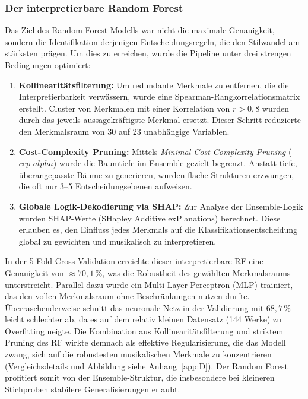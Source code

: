 \documentclass[10pt,a4paper]{article}
\theoremstyle{definition}
\begin{document}
\subsubsection{Der interpretierbare Random Forest}
Das Ziel des Random-Forest-Modells war nicht die maximale Genauigkeit, sondern die Identifikation derjenigen Entscheidungsregeln, die den Stilwandel am stärksten prägen. Um dies zu erreichen, wurde die Pipeline unter drei strengen Bedingungen optimiert:

\begin{enumerate}
    \item \textbf{Kollinearitätsfilterung:} Um redundante Merkmale zu entfernen, die die Interpretierbarkeit verwässern, wurde eine Spearman-Rangkorrelationsmatrix erstellt. Cluster von Merkmalen mit einer Korrelation von $r > 0{,}8$ wurden durch das jeweils aussagekräftigste Merkmal ersetzt. Dieser Schritt reduzierte den Merkmalsraum von 30 auf 23 unabhängige Variablen.
    
    \item \textbf{Cost-Complexity Pruning:} Mittels \textit{Minimal Cost-Complexity Pruning} ($ccp\_alpha$) wurde die Baumtiefe im Ensemble gezielt begrenzt. Anstatt tiefe, überangepasste Bäume zu generieren, wurden flache Strukturen erzwungen, die oft nur 3--5 Entscheidungsebenen aufweisen.
    
    \item \textbf{Globale Logik-Dekodierung via SHAP:} Zur Analyse der Ensemble-Logik wurden SHAP-Werte (SHapley Additive exPlanations) berechnet. Diese erlauben es, den Einfluss jedes Merkmals auf die Klassifikationsentscheidung global zu gewichten und musikalisch zu interpretieren.
\end{enumerate}

\noindent In der 5-Fold Cross-Validation erreichte dieser interpretierbare RF eine Genauigkeit von $\approx 70{,}1\,\%$, was die Robustheit des gewählten Merkmalsraums unterstreicht. Parallel dazu wurde ein Multi-Layer Perceptron (MLP) trainiert, das den vollen Merkmalsraum ohne Beschränkungen nutzen durfte. Überraschenderweise schnitt das neuronale Netz in der Validierung mit $68{,}7\,\%$ leicht schlechter ab, da es auf dem relativ kleinen Datensatz (144 Werke) zu Overfitting neigte. Die Kombination aus Kollinearitätsfilterung und striktem Pruning des RF wirkte demnach als effektive Regularisierung, die das Modell zwang, sich auf die robustesten musikalischen Merkmale zu konzentrieren (\hyperref[app:D]{Vergleichsdetails und  Abbildung siehe Anhang~\ref*{app:D}}). Der Random Forest profitiert somit von der Ensemble-Struktur, die insbesondere bei kleineren Stichproben stabilere Generalisierungen erlaubt.
\end{document}

